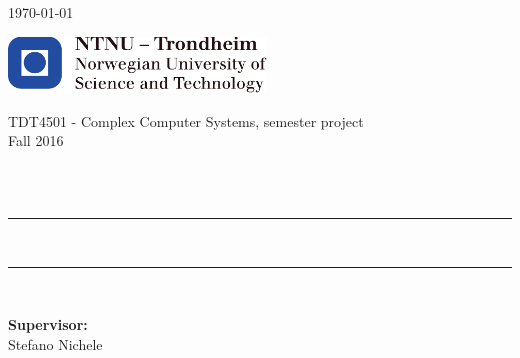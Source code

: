\begin{titlepage}


{\large \today}
\vspace{1.0cm}

\includegraphics[height=1.5cm]{images/ntnu_logo.pdf} 
\vspace{1.0cm}

\begin{center} 
    TDT4501 - Complex Computer Systems, semester project
    \\
    Fall 2016
    
    ~\\[3.5cm]
    
    \LARGE \textbf{\myauthor}\\[1.5cm]
    
    \hrule ~\\[0.2cm]
    {\fontsize{25pt}{40pt}\selectfont\mytitle}	%
    \vspace{0.5cm}
    \hrule ~\\[0.2cm]
    
    
    \vspace{1.5cm}
\end{center}




\vfill


\begin{center}
{\large\textbf{Supervisor:}}
\\
Stefano Nichele
\end{center}
\vspace{0.5cm} 






\end{titlepage}